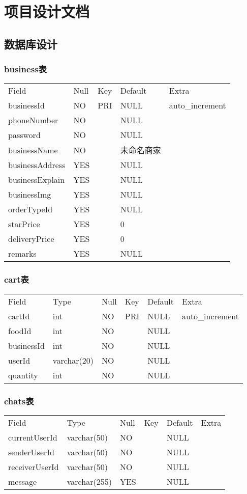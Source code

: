 
\chapter{项目设计文档}

\section{数据库设计}

\subsection{business表}


\begin{longtable}[]{@{}lllll@{}}
\toprule
Field & Null & Key & Default & Extra\tabularnewline
businessId & NO & PRI & NULL & auto\_increment\tabularnewline
phoneNumber & NO & & NULL &\tabularnewline
password & NO & & NULL &\tabularnewline
businessName & NO & & 未命名商家 &\tabularnewline
businessAddress & YES & & NULL &\tabularnewline
businessExplain & YES & & NULL &\tabularnewline
businessImg & YES & & NULL &\tabularnewline
orderTypeId & YES & & NULL &\tabularnewline
starPrice & YES & & 0 &\tabularnewline
deliveryPrice & YES & & 0 &\tabularnewline
remarks & YES & & NULL &\tabularnewline
\bottomrule
\end{longtable}

\subsection{cart表}

\begin{longtable}[]{@{}llllll@{}}
\toprule
Field & Type & Null & Key & Default & Extra\tabularnewline
cartId & int & NO & PRI & NULL & auto\_increment\tabularnewline
foodId & int & NO & & NULL &\tabularnewline
businessId & int & NO & & NULL &\tabularnewline
userId & varchar(20) & NO & & NULL &\tabularnewline
quantity & int & NO & & NULL &\tabularnewline
\bottomrule
\end{longtable}

\subsection{chats表}

\begin{longtable}[]{@{}llllll@{}}
\toprule
Field & Type & Null & Key & Default & Extra\tabularnewline
currentUserId & varchar(50) & NO & & NULL &\tabularnewline
senderUserId & varchar(50) & NO & & NULL &\tabularnewline
receiverUserId & varchar(50) & NO & & NULL &\tabularnewline
message & varchar(255) & YES & & NULL &\tabularnewline
\bottomrule
\end{longtable}

